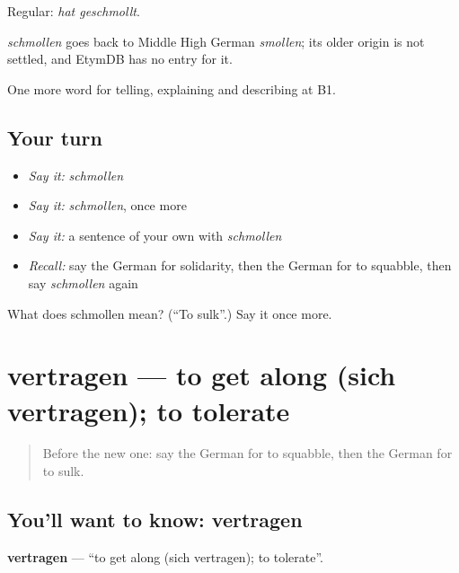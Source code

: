 Regular: \emph{hat geschmollt}.

\begin{cousinweb}
\emph{schmollen} goes back to Middle High German \emph{smollen}; its older origin is not settled, and EtymDB has no entry for it.
\end{cousinweb}

\begin{grammarlens}[title={What you've built}]
One more word for telling, explaining and describing at B1.
\end{grammarlens}

\subsection*{Your turn}
\begin{itemize}
\raggedright
  \item \emph{Say it:} \emph{schmollen}
  \item \emph{Say it:} \emph{schmollen}, once more
  \item \emph{Say it:} a sentence of your own with \emph{schmollen}
  \item \emph{Recall:} say the German for solidarity, then the German for to squabble, then say \emph{schmollen} again
\end{itemize}

\begin{tcolorbox}[breakable,colback=teal!4,colframe=teal!35!black,title={Before you move on}]
What does schmollen mean? (\textquotedblleft{}To sulk\textquotedblright{}.) Say it once more.
\end{tcolorbox}
\section[vertragen]{vertragen — to get along (sich vertragen); to tolerate}

\label{lesson:GE-C494-vertragen}



\begin{quote}
Before the new one: say the German for to squabble, then the German for to sulk.
\end{quote}

\subsection*{You'll want to know: vertragen}
\textbf{vertragen} — \textquotedblleft{}to get along (sich vertragen); to tolerate\textquotedblright{}.

